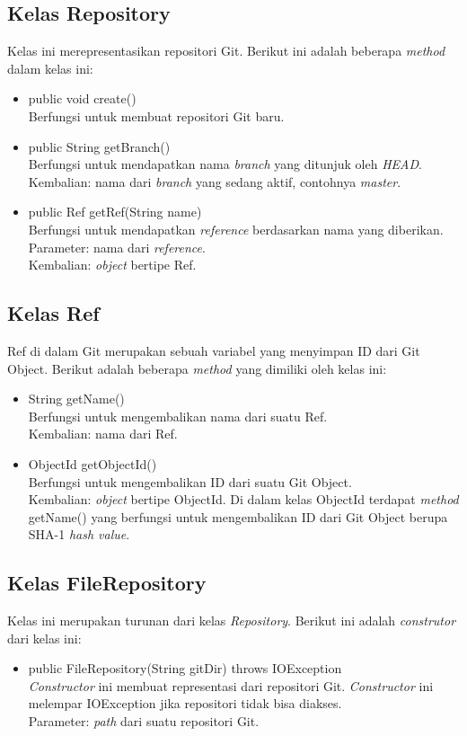 \subsection{Kelas Repository}
\label{subsec:repository}
Kelas ini merepresentasikan repositori Git. Berikut ini adalah beberapa \textit{method} dalam kelas ini:
\begin{itemize}
\item public void create()\\
Berfungsi untuk membuat repositori Git baru. 
\item public String getBranch()\\
Berfungsi untuk mendapatkan nama \textit{branch} yang ditunjuk oleh \textit{HEAD}.\\
Kembalian: nama dari \textit{branch} yang sedang aktif, contohnya \textit{master}.
\item public Ref getRef(String name)\\
Berfungsi untuk mendapatkan \textit{reference} berdasarkan nama yang diberikan.\\
Parameter: nama dari \textit{reference}.\\
Kembalian: \textit{object} bertipe Ref.
\end{itemize} 

\subsection{Kelas Ref}
\label{subsec:ref}
Ref di dalam Git merupakan sebuah variabel yang menyimpan ID dari Git Object.
Berikut adalah beberapa \textit{method} yang dimiliki oleh kelas ini:
\begin{itemize}
\item String getName()\\
Berfungsi untuk mengembalikan nama dari suatu Ref.\\
Kembalian: nama dari Ref.
\item ObjectId getObjectId()\\
Berfungsi untuk mengembalikan ID dari suatu Git Object.\\
Kembalian: \textit{object} bertipe ObjectId. Di dalam kelas ObjectId terdapat \textit{method} getName() yang berfungsi untuk mengembalikan ID dari Git Object berupa SHA-1 \textit{hash value}. 
\end{itemize}



\subsection{Kelas FileRepository}
\label{subsec:filerepository}
Kelas ini merupakan turunan dari kelas \textit{Repository}. Berikut ini adalah \textit{construtor} dari kelas ini:
\begin{itemize}
\item public FileRepository(String gitDir) throws IOException\\
\textit{Constructor} ini membuat representasi dari repositori Git. \textit{Constructor} ini melempar IOException jika repositori tidak bisa diakses.\\
Parameter: \textit{path} dari suatu repositori Git.
\end{itemize}

